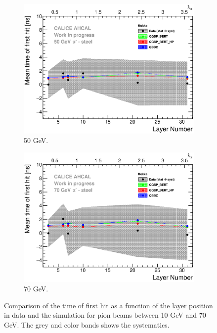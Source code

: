 \begin{figure}[htbp!]
  \hfill
  \begin{subfigure}[t]{0.49\textwidth}
    \centering
    \includegraphics[width=1\textwidth]{../Thesis_Plots/Timing/Pions/Plots/ComparisonToSim/Time_Depth_50GeV_Mokka.eps}
    \caption{50 GeV.} \label{fig:Depth_SimData_50GeV}
  \end{subfigure}
  \hfill
  \begin{subfigure}[t]{0.49\textwidth}
    \centering
    \includegraphics[width=1\textwidth]{../Thesis_Plots/Timing/Pions/Plots/ComparisonToSim/Time_Depth_70GeV_Mokka.eps}
    \caption{70 GeV.} \label{fig:Depth_SimData_70GeV}
  \end{subfigure}
  \caption{Comparison of the time of first hit as a function of the layer position in data and the \mokka simulation for pion beams between 10 GeV and 70 GeV. The grey and color bands shows the systematics.}
\end{figure}

